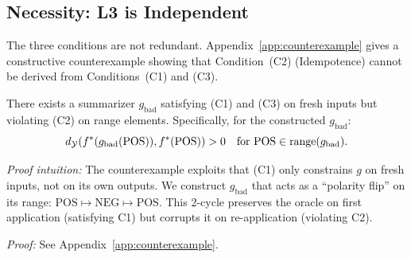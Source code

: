 \subsection{Necessity: L3 is Independent}

The three conditions are not redundant. Appendix~\ref{app:counterexample} gives a constructive counterexample showing that Condition~(C2) (Idempotence) cannot be derived from Conditions~(C1) and (C3).

\begin{theorem}[L3 is substantive]\label{thm:l3-necessary}
There exists a summarizer $g_{\mathrm{bad}}$ satisfying (C1) and (C3) on fresh inputs but violating (C2) on range elements. Specifically, for the constructed $g_{\mathrm{bad}}$:
\[
d_{\mathcal{Y}}(f^{\ast}(g_{\mathrm{bad}}(\text{POS})), f^{\ast}(\text{POS})) > 0 \quad \text{for } \text{POS} \in \operatorname{range}(g_{\mathrm{bad}}).
\]
\end{theorem}

\noindent\textit{Proof intuition:} The counterexample exploits that (C1) only constrains $g$ on fresh inputs, not on its own outputs. We construct $g_{\mathrm{bad}}$ that acts as a ``polarity flip'' on its range: $\text{POS} \mapsto \text{NEG} \mapsto \text{POS}$. This 2-cycle preserves the oracle on first application (satisfying C1) but corrupts it on re-application (violating C2).

\noindent\textit{Proof:} See Appendix~\ref{app:counterexample}.
